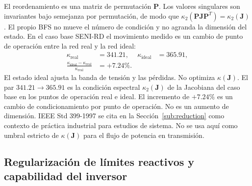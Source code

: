 El reordenamiento es una matriz de permutación $\mathbf{P}$. Los valores singulares son invariantes bajo semejanza por permutación, de modo que $\kappa_2(\mathbf{P}\mathbf{J}\mathbf{P}^{T})=\kappa_2(\mathbf{J})$. El propio BFS no mueve el número de condición y no agranda la dimensión del estado. En el caso base SENI-RD el movimiento medido es un cambio de punto de operación entre la red real y la red ideal:
\begin{equation}
\begin{aligned}
\kappa_{\mathrm{real}} &= 341.21, &
\kappa_{\mathrm{ideal}} &= 365.91, \\
\frac{\kappa_{\mathrm{ideal}}-\kappa_{\mathrm{real}}}{\kappa_{\mathrm{real}}}
&= +7.24\%.
\end{aligned}
\label{eq:bfs}
\end{equation}
El estado ideal ajusta la banda de tensión y las pérdidas. No optimiza $\kappa(\mathbf{J})$. El par $341.21 \to 365.91$ es la condición espectral $\kappa_2(\mathbf{J})$ de la Jacobiana del caso base en los puntos de operación real e ideal. El incremento de $+7.24\%$ es un cambio de condicionamiento por punto de operación. No es un aumento de dimensión. IEEE Std 399-1997 \cite{ieee399} se cita en la Sección~\ref{sub:reduction} como contexto de práctica industrial para estudios de sistema. No se usa aquí como umbral estricto de $\kappa(\mathbf{J})$ para el flujo de potencia en transmisión.

\subsection{Regularización de límites reactivos y capabilidad del inversor}
\label{sub:regularization}

